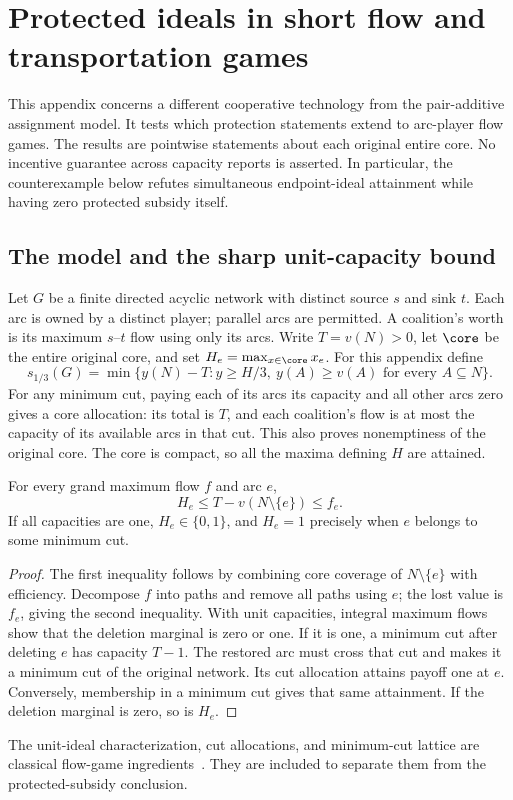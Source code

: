 \section{Protected ideals in short flow and transportation games}\label{flow:section}
This appendix concerns a different cooperative technology from the
pair-additive assignment model. It tests which protection statements extend
to arc-player flow games. The results are pointwise statements about each
original entire core. No incentive guarantee across capacity reports is
asserted. In particular, the counterexample below refutes simultaneous
endpoint-ideal attainment while having zero protected subsidy itself.

\subsection{The model and the sharp unit-capacity bound}
Let $G$ be a finite directed acyclic network with distinct source $s$ and
sink $t$. Each arc is owned by a distinct player; parallel arcs are
permitted. A coalition's worth is its maximum $s$--$t$ flow using only its
arcs. Write $T=v(N)>0$, let $\core$ be the entire original core, and set
$H_e=\max_{x\in\core}x_e$. For this appendix define
\[
 s_{1/3}(G)=\min\{y(N)-T:y\ge H/3,\ y(A)\ge v(A)
                                   \text{ for every }A\subseteq N\}.
\]
For any minimum cut, paying each of its arcs its capacity and all other
arcs zero gives a core allocation: its total is $T$, and each coalition's
flow is at most the capacity of its available arcs in that cut. This
also proves nonemptiness of the original core. The core is compact, so
all the maxima defining $H$ are attained.

\begin{lemma}\label{flow:ideals}
For every grand maximum flow $f$ and arc $e$,
\[
                    H_e\le T-v(N\setminus\{e\})\le f_e.
\]
If all capacities are one, $H_e\in\{0,1\}$, and $H_e=1$ precisely
when $e$ belongs to some minimum cut.
\end{lemma}
\begin{proof}
The first inequality follows by combining core coverage of
$N\setminus\{e\}$ with efficiency. Decompose $f$ into paths and remove
all paths using $e$; the lost value is $f_e$, giving the second inequality.
With unit capacities, integral maximum flows show that the deletion
marginal is zero or one. If it is one, a minimum cut after deleting $e$
has capacity $T-1$. The restored arc must cross that cut and makes it a
minimum cut of the original network. Its cut allocation attains payoff
one at $e$. Conversely, membership in a minimum cut gives that same
attainment. If the deletion marginal is zero, so is $H_e$.
\end{proof}
The unit-ideal characterization, cut allocations, and minimum-cut lattice
are classical flow-game ingredients~\cite{flow:Fang2010,flow:KalaiZemel1980}.
They are included to separate them from the protected-subsidy conclusion.

